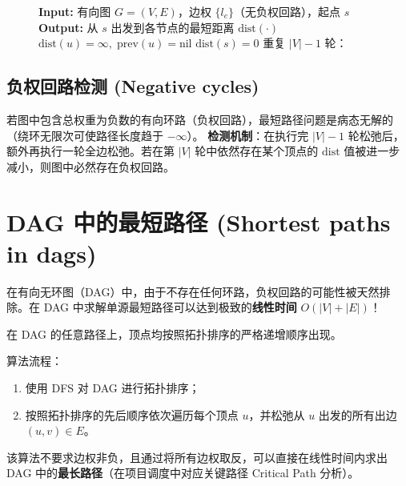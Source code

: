 \begin{figure}[htbp]
\centering
\begin{tcolorbox}[colback=white,colframe=gray!50!black,title={\textbf{图 4.13}\quad Bellman-Ford 算法}]
\begin{algorithmic}[1]
    \State \textbf{Input:} 有向图 $G = (V, E)$，边权 $\{l_e\}$（无负权回路），起点 $s$
    \State \textbf{Output:} 从 $s$ 出发到各节点的最短距离 $\text{dist}(\cdot)$
        \State $\text{dist}(u) = \infty,\; \text{prev}(u) = \text{nil}$
    \EndFor
    \State $\text{dist}(s) = 0$
    \State 重复 $|V| - 1$ 轮：
        \State {}
    \EndFor
\EndProcedure
\end{algorithmic}
\end{tcolorbox}
\label{fig:bellman_ford_alg}
\end{figure}

\subsection{负权回路检测 (Negative cycles)}
若图中包含总权重为负数的有向环路（负权回路），最短路径问题是病态无解的（绕环无限次可使路径长度趋于 $-\infty$）。
\textbf{检测机制}：在执行完 $|V| - 1$ 轮松弛后，额外再执行一轮全边松弛。若在第 $|V|$ 轮中依然存在某个顶点的 $\text{dist}$ 值被进一步减小，则图中必然存在负权回路。

\section{DAG 中的最短路径 (Shortest paths in dags)}

在有向无环图（DAG）中，由于不存在任何环路，负权回路的可能性被天然排除。在 DAG 中求解单源最短路径可以达到极致的\textbf{线性时间} $O(|V| + |E|)$！

\begin{property}
在 DAG 的任意路径上，顶点均按照拓扑排序的严格递增顺序出现。
\end{property}

算法流程：
\begin{enumerate}
    \item 使用 DFS 对 DAG 进行拓扑排序；
    \item 按照拓扑排序的先后顺序依次遍历每个顶点 $u$，并松弛从 $u$ 出发的所有出边 $(u, v) \in E$。
\end{enumerate}
该算法不要求边权非负，且通过将所有边权取反，可以直接在线性时间内求出 DAG 中的\textbf{最长路径}（在项目调度中对应关键路径 Critical Path 分析）。

